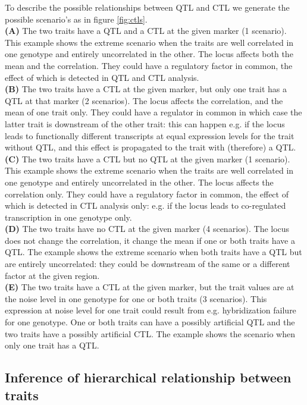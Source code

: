   To describe the possible relationships between QTL and CTL we generate the possible scenario's as in figure \ref{fig:ctls}.\\
  {\bf(A)} The two traits have a QTL and a CTL at the given marker (1 scenario). This example shows the extreme scenario when the traits are 
  well correlated in one genotype and entirely uncorrelated in the other. The locus affects both the mean and the correlation. They could 
  have a regulatory factor in common, the effect of which is detected in QTL and CTL analysis.\\
  {\bf(B)} The two traits have a CTL at the given marker, but only one trait has a QTL at that marker (2 scenarios).  The locus affects the 
  correlation, and the mean of one trait only. They could have a regulator in common in which case the latter trait is downstream of the other 
  trait: this can happen e.g. if the locus leads to functionally different transcripts at equal expression levels for the trait without QTL, 
  and this effect is propagated to the trait with (therefore) a QTL.\\
  {\bf(C)} The two traits have a CTL but no QTL at the given marker (1 scenario). This example shows the extreme scenario when the traits 
  are well correlated in one genotype and entirely uncorrelated in the other.  The locus affects the correlation only. They could have a 
  regulatory factor in common, the effect of which is detected in CTL analysis only: e.g. if the locus leads to co-regulated transcription 
  in one genotype only.\\
  {\bf(D)} The two traits have no CTL at the given marker  (4 scenarios).  The locus does not change the correlation, it change the mean 
  if one or both traits have a QTL. The example shows the extreme scenario when both traits have a QTL but are entirely uncorrelated: they 
  could be downstream of the same or a different factor at the given region.\\
  {\bf(E)} The two traits have a CTL at the given marker, but the trait values are at the noise level in one genotype for one or both 
  traits (3 scenarios). This expression at noise level for one trait could result from e.g. hybridization failure for one genotype. One 
  or both traits can have a possibly artificial QTL and the two traits have a possibly artificial CTL. The example shows the scenario 
  when only one trait has a QTL.

\subsection{Inference of hierarchical relationship between traits}
